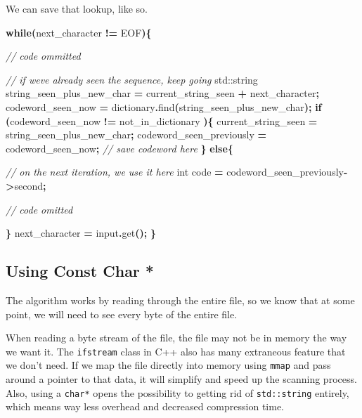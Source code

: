 \documentclass[12pt,twoside]{reedthesis}
\newenvironment{Shaded}{\begin{snugshade}}{\end{snugshade}}
\newcommand{\BuiltInTok}[1]{#1}
\newcommand{\CommentTok}[1]{\textcolor[rgb]{0.56,0.35,0.01}{\textit{#1}}}
\newcommand{\ControlFlowTok}[1]{\textcolor[rgb]{0.13,0.29,0.53}{\textbf{#1}}}
\newcommand{\DataTypeTok}[1]{\textcolor[rgb]{0.13,0.29,0.53}{#1}}
\newcommand{\NormalTok}[1]{#1}
\newcommand{\OperatorTok}[1]{\textcolor[rgb]{0.81,0.36,0.00}{\textbf{#1}}}
\begin{document}
We can save that lookup, like so.
\begin{Shaded}
\begin{Highlighting}[]

\ControlFlowTok{while}\OperatorTok{(}\NormalTok{next\_character }\OperatorTok{!=}\NormalTok{ EOF}\OperatorTok{)\{}

    \CommentTok{// code ommitted}

    \CommentTok{// if we\textquotesingle{}ve already seen the sequence, keep going}
    \BuiltInTok{std::}\NormalTok{string}\OperatorTok{ }\NormalTok{string\_seen\_plus\_new\_char }\OperatorTok{=}\NormalTok{ current\_string\_seen }\OperatorTok{+}\NormalTok{ next\_character}\OperatorTok{;}
\NormalTok{    codeword\_seen\_now }\OperatorTok{=}\NormalTok{ dictionary}\OperatorTok{.}\NormalTok{find}\OperatorTok{(}\NormalTok{string\_seen\_plus\_new\_char}\OperatorTok{);}
    \ControlFlowTok{if} \OperatorTok{(}\NormalTok{codeword\_seen\_now }\OperatorTok{!=}\NormalTok{ not\_in\_dictionary }\OperatorTok{)\{}
\NormalTok{        current\_string\_seen }\OperatorTok{=}\NormalTok{ string\_seen\_plus\_new\_char}\OperatorTok{;}
\NormalTok{        codeword\_seen\_previously }\OperatorTok{=}\NormalTok{ codeword\_seen\_now}\OperatorTok{;} \CommentTok{// save codeword here}
    \OperatorTok{\}}
    \ControlFlowTok{else}\OperatorTok{\{}

        \CommentTok{// on the next iteration, we use it here}
        \DataTypeTok{int}\NormalTok{ code }\OperatorTok{=}\NormalTok{ codeword\_seen\_previously}\OperatorTok{{-}\textgreater{}}\NormalTok{second}\OperatorTok{;}

        \CommentTok{// code omitted}

    \OperatorTok{\}}
\NormalTok{    next\_character }\OperatorTok{=}\NormalTok{ input}\OperatorTok{.}\NormalTok{get}\OperatorTok{();}
\OperatorTok{\}}
\end{Highlighting}
\end{Shaded}
\hypertarget{using-const-char}{%
\subsection{Using Const Char *}\label{using-const-char}}

The algorithm works by reading through the entire file, so we know that at some point, we will need to see every byte of the entire file.

When reading a byte stream of the file, the file may not be in memory the way we want it. The \texttt{ifstream} class in C++ also has many extraneous feature that we don't need. If we map the file directly into memory using \texttt{mmap} and pass around a pointer to that data, it will simplify and speed up the scanning process. Also, using a \texttt{char*} opens the possibility to getting rid of \texttt{std::string} entirely, which means way less overhead and decreased compression time.
\end{document}
